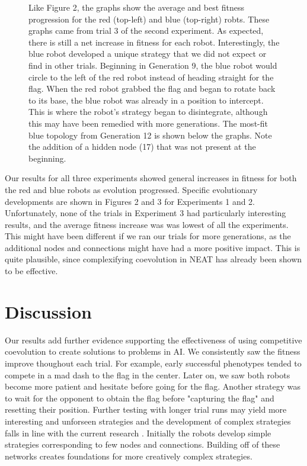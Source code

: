 \documentclass[11pt]{article}
\begin{document}
\begin{figure}[h]
\begin{center}
\end{center}
\caption{Like Figure 2, the graphs show the average and best fitness progression for the red (top-left) and blue (top-right) robts. These graphs came from trial 3 of the second experiment. As expected, there is still a net increase in fitness for each robot. Interestingly, the blue robot developed a unique strategy that we did not expect or find in other trials. Beginning in Generation 9, the blue robot would circle to the left of the red robot instead of heading straight for the flag. When the red robot grabbed the flag and began to rotate back to its base, the blue robot was already in a position to intercept. This is where the robot's strategy began to disintegrate, although this may have been remedied with more generations. The most-fit blue topology from Generation 12 is shown below the graphs. Note the addition of a hidden node (17) that was not present at the beginning.}
\label{experiment1fitness}
\end{figure}

Our results for all three experiments showed general increases in fitness for both the red and blue robots as evolution progressed. Specific evolutionary developments are shown in Figures 2 and 3 for Experiments 1 and 2. Unfortunately, none of the trials in Experiment 3 had particularly interesting results, and the average fitness increase was was lowest of all the experiments. This might have been different if we ran our trials for more generations, as the additional nodes and connections might have had a more positive impact. This is quite plausible, since complexifying coevolution in NEAT has already been shown to be effective.

\section{Discussion}

Our results add further evidence supporting the effectiveness of using competitive coevolution to create solutions to problems in AI. We consistently saw the fitness improve thoughout each trial.  For example, early successful phenotypes tended to compete in a mad dash to the flag in the center.  Later on, we saw both robots become more patient and hesitate before going for the flag.  Another strategy was to wait for the opponent to obtain the flag before "capturing the flag" and resetting their position. Further testing with longer trial runs may yield more interesting and unforseen strategies and the development of complex strategies falls in line with the current research \cite{NEAT}.  Initially the robots develop simple strategies corresponding to few nodes and connections. Building off of these networks creates foundations for more creatively complex strategies. 
\end{document}
